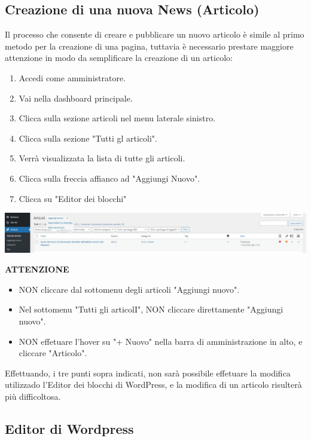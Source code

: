 \documentclass{article}
\begin{document}
	\subsection{\textbf{Creazione di una nuova News (Articolo)}}

	Il processo che consente di creare e pubblicare un nuovo articolo è simile al primo metodo per la creazione di una pagina, tuttavia è necessario prestare maggiore attenzione in modo da semplificare la creazione di un articolo:
	
	\begin{enumerate}
		\item Accedi come amministratore.
		\item Vai nella dashboard principale.
		\item Clicca sulla sezione articoli nel menu laterale sinistro.
		\item Clicca sulla sezione "Tutti gl articoli".
		\item Verrà visualizzata la lista di tutte gli articoli.
		\item Clicca sulla freccia affianco ad "Aggiungi Nuovo".
		\item Clicca su "Editor dei blocchi"
	\end{enumerate}

	\includegraphics[scale=0.19]{Nuovo Articolo Blocchi.jpeg}

	\textbf{ATTENZIONE}
	\begin{itemize}
		\item NON cliccare dal sottomenu degli articoli "Aggiungi nuovo".
		\item Nel sottomenu "Tutti gli articolI", NON cliccare direttamente "Aggiungi nuovo".
		\item NON effetuare l'hover su "+ Nuovo" nella barra di amministrazione in alto, e cliccare "Articolo".
	\end{itemize}
	Effettuando, i tre punti sopra indicati, non sarà possibile effetuare la modifica utilizzado l'Editor dei blocchi di WordPress, e la modifica di un articolo risulterà più difficoltosa.

	\subsection{\textbf{Editor di Wordpress}}
\end{document}
